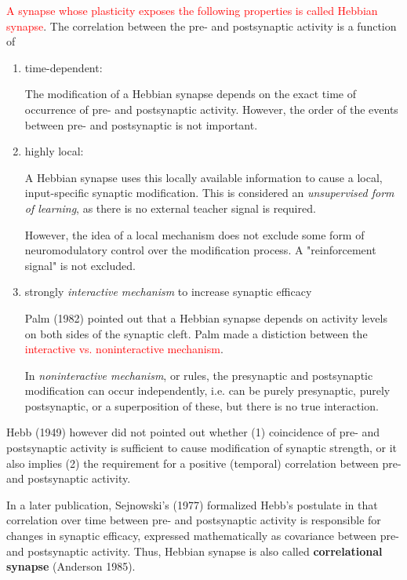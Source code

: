 \textcolor{red}{A
synapse whose plasticity exposes the following properties is called Hebbian synapse}.
The correlation between the pre- and postsynaptic activity is a function of
\begin{enumerate}
  \item time-dependent: 
  
  The modification of a Hebbian synapse depends on the exact time of occurrence
  of pre- and postsynaptic activity. However, the order of the events between
  pre- and postsynaptic is not important.
  
  \item highly local:
  
  A Hebbian synapse uses this locally available information to cause a local,
  input-specific synaptic modification. This is considered an {\it unsupervised
  form of learning}, as there is no external teacher signal is required.
  
  However, the idea of a local mechanism does not exclude some form of
  neuromodulatory control over the modification process. A "reinforcement
  signal" is not excluded.

  \item strongly {\it interactive mechanism} to increase synaptic efficacy
  
  Palm (1982) pointed out that a Hebbian synapse depends on activity levels on
  both sides of the synaptic cleft. Palm made a distiction between the
  \textcolor{red}{interactive vs. noninteractive mechanism}.
  
  In {\it noninteractive mechanism}, or rules, the presynaptic and postsynaptic
  modification can occur independently, i.e. can be purely presynaptic, purely
  postsynaptic, or a superposition of these, but there is no true interaction.
\end{enumerate}

Hebb (1949) however did not pointed out whether (1) coincidence of pre- and
postsynaptic activity is sufficient to cause modification of synaptic strength,
or it also implies (2) the requirement for a positive (temporal) correlation
between pre- and postsynaptic activity. 

In a later publication, Sejnowski's (1977) formalized Hebb's postulate in
that correlation over time between pre- and postsynaptic activity is responsible
for changes in synaptic efficacy, expressed mathematically as covariance between
pre- and postsynaptic activity. Thus, Hebbian synapse is also called {\bf
correlational synapse} (Anderson 1985).

